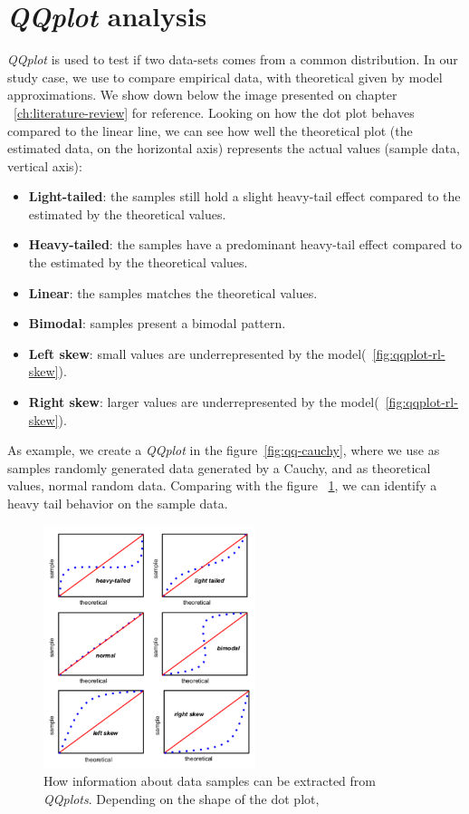 \section{\textit{QQplot} analysis}

\textit{QQplot} is used to test if two data-sets comes from a common distribution\cite{web-qqplot}. In our study case, we use to compare empirical data, with theoretical given by model approximations. We show down below the image presented on chapter ~\ref{ch:literature-review} for reference. Looking on how the dot plot behaves compared to the linear line, we can see how well the theoretical plot (the estimated data, on the horizontal axis) represents the actual values (sample data, vertical axis):

\begin{itemize}
\item \textbf{Light-tailed}: the samples still hold a slight heavy-tail effect compared to the estimated by the theoretical values.
\item \textbf{Heavy-tailed}: the samples have a predominant heavy-tail effect compared to the estimated by the theoretical values.
\item \textbf{Linear}: the samples matches the theoretical values.
\item \textbf{Bimodal}: samples present a bimodal pattern.
\item \textbf{Left skew}: small values are underrepresented by the model(~\ref{fig:qqplot-rl-skew}).
\item \textbf{Right skew}: larger values are underrepresented by the model(~\ref{fig:qqplot-rl-skew}).
\end{itemize}

As example, we create a \textit{QQplot} in the figure~\ref{fig:qq-cauchy}, where we use as samples randomly generated data generated by a Cauchy, and as theoretical values, normal random data. Comparing with the figure ~\ref{fig:qqplot-tutorial-ap}, we can identify a heavy tail behavior on the sample data.

\begin{figure}[ht!]
	\centering
	\includegraphics[width=0.55\textwidth]{figures/ch2/qqplot-tutorial}
	\caption{How information about data samples can be extracted from \textit{QQplots}. Depending on the shape of the dot plot,  }
	\label{fig:qqplot-tutorial-ap}
\end{figure}

